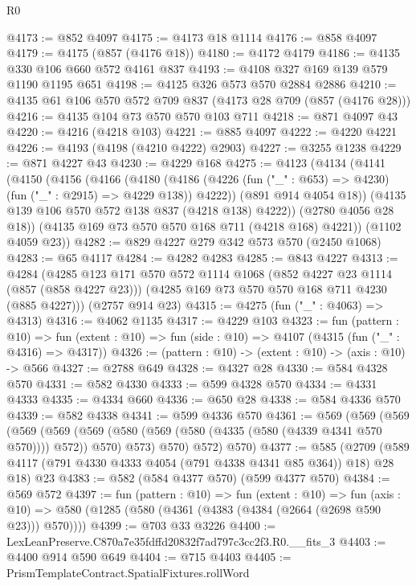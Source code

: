 \begin{lexlean}{R0}
\begin{coremodule}
@4173 := @852 @4097
@4175 := @4173 @18 @1114
@4176 := @858 @4097
@4179 := @4175 (@857 (@4176 @18))
@4180 := @4172 @4179
@4186 := @4135 @330 @106 @660 @572 @4161 @837
@4193 := @4108 @327 @169 @139 @579 @1190 @1195 @651
@4198 := @4125 @326 @573 @570 @2884 @2886
@4210 := @4135 @61 @106 @570 @572 @709 @837 (@4173 @28 @709 (@857 (@4176 @28)))
@4216 := @4135 @104 @73 @570 @570 @103 @711
@4218 := @871 @4097 @43
@4220 := @4216 (@4218 @103)
@4221 := @885 @4097
@4222 := @4220 @4221
@4226 := @4193 (@4198 (@4210 @4222) @2903)
@4227 := @3255 @1238
@4229 := @871 @4227 @43
@4230 := @4229 @168
@4275 := @4123
    (@4134
      (@4141
        (@4150
          (@4156
            (@4166
              (@4180
                (@4186 (@4226 (fun ("_" : @653) => @4230) (fun ("_" : @2915) => @4229 @138)) @4222))
              (@891 @914 @4054 @18))
            (@4135 @139 @106 @570 @572 @138 @837 (@4218 @138) @4222))
          (@2780 @4056 @28 @18))
        (@4135 @169 @73 @570 @570 @168 @711 (@4218 @168) @4221))
      (@1102 @4059 @23))
@4282 := @829 @4227 @279 @342 @573 @570 (@2450 @1068)
@4283 := @65 @4117
@4284 := @4282 @4283
@4285 := @843 @4227
@4313 := @4284
    (@4285
      @123
      @171
      @570
      @572
      @1114
      @1068
      (@852 @4227 @23 @1114 (@857 (@858 @4227 @23)))
      (@4285 @169 @73 @570 @570 @168 @711 @4230 (@885 @4227)))
    (@2757 @914 @23)
@4315 := @4275 (fun ("_" : @4063) => @4313)
@4316 := @4062 @1135
@4317 := @4229 @103
@4323 := fun (pattern : @10) =>
  fun (extent : @10) => fun (side : @10) => @4107 (@4315 (fun ("_" : @4316) => @4317))
@4326 := (pattern : @10) -> (extent : @10) -> (axis : @10) -> @566
@4327 := @2788 @649
@4328 := @4327 @28
@4330 := @584 @4328 @570
@4331 := @582 @4330
@4333 := @599 @4328 @570
@4334 := @4331 @4333
@4335 := @4334 @660
@4336 := @650 @28
@4338 := @584 @4336 @570
@4339 := @582 @4338
@4341 := @599 @4336 @570
@4361 := @569
    (@569
      (@569
        (@569
          (@569 (@569 (@580 (@569 (@580 (@4335 (@580 (@4339 @4341 @570 @570)))) @572)) @570) @573)
          @570)
        @572)
      @570)
@4377 := @585
    (@2709 (@589 @4117 (@791 @4330 @4333 @4054 (@791 @4338 @4341 @85 @364)) @18) @28 @18)
    @23
@4383 := @582 (@584 @4377 @570) (@599 @4377 @570)
@4384 := @569 @572
@4397 := fun (pattern : @10) =>
  fun (extent : @10) =>
  fun (axis : @10) => @580 (@1285 (@580 (@4361 (@4383 (@4384 (@2664 (@2698 @590 @23))) @570))))
@4399 := @703 @33 @3226
@4400 := LexLeanPreserve.C870a7e35fdffd20832f7ad797c3cc2f3.R0.__fits_3
@4403 := @4400 @914 @590 @649
@4404 := @715 @4403
@4405 := PrismTemplateContract.SpatialFixtures.rollWord

\end{coremodule}
\end{lexlean}

